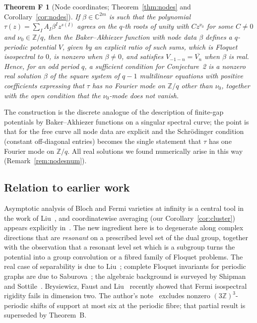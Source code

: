 \documentclass[11pt,reqno]{amsart}
\newtheorem*{theoremF}{Theorem F}
\theoremstyle{definition}
\theoremstyle{remark}
\newcommand{\C}{\mathbb C}
\newcommand{\Z}{\mathbb Z}
\begin{document}
\begin{theoremF}[Node coordinates; Theorem~\ref{thm:nodes} and Corollary~\ref{cor:nodes}]
If $\beta\in\C^{2m}$ is such that the polynomial
$\tau(z)=\sum_{I}A_I\beta^Iz^{s(I)}$ agrees on the $q$-th roots of unity with
$Cz^{\nu_0}$ for some $C\ne0$ and $\nu_0\in\Z/q$, then the Baker--Akhiezer
function with node data $\beta$ defines a $q$-periodic potential $V$, given
by an explicit ratio of such sums, which is Floquet isospectral to $0$, is
nonzero when $\beta\ne0$, and satisfies $V_{-1-n}=\overline{V_n}$ when $\beta$ is
real.  Hence, for an odd period $q$, a sufficient condition for Conjecture~2
is a nonzero real solution $\beta$ of the square system of $q-1$ multilinear
equations with positive coefficients expressing that $\tau$ has no Fourier
mode on $\Z/q$ other than $\nu_0$, together with the open condition that the
$\nu_0$-mode does not vanish.
\end{theoremF}

The construction is the discrete analogue of the description of finite-gap
potentials by Baker--Akhiezer functions on a singular spectral curve; the
point is that for the free curve all node data are explicit and the
Schr\"odinger condition (constant off-diagonal entries) becomes the single
statement that $\tau$ has one Fourier mode on $\Z/q$.  All real solutions we
found numerically arise in this way (Remark~\ref{rem:nodesnum}).

\subsection{Relation to earlier work}
Asymptotic analysis of Bloch and Fermi varieties at infinity is a central
tool in the work of Liu~\cite{Liu2022GAFA,LiuFermi,Liu2023JDE}, and
coordinatewise averaging (our Corollary~\ref{cor:cluster}) appears explicitly
in~\cite[Part~12]{KeioGPT}.  The new ingredient here is to
degenerate along complex directions that are \emph{resonant} on a prescribed
level set of the dual group, together with the observation that a resonant
level set which is a subgroup turns the potential into a group convolution or
a fibred family of Floquet problems.  The real case of separability is due to
Liu~\cite{Liu2023JDE}; complete Floquet invariants for periodic graphs are due
to Saburova~\cite{Saburova2026}; the algebraic background is surveyed by Shipman
and Sottile~\cite{ShipmanSottile}.  Brysiewicz, Faust and Liu~\cite{BFL2026}
recently showed that Fermi isospectral rigidity fails in dimension two.  The
author's note~\cite{KeioSparse} excludes nonzero $(3\Z)^3$-periodic shifts of
support at most six at the periodic fibre; that partial result is superseded by
Theorem~B.
\end{document}
